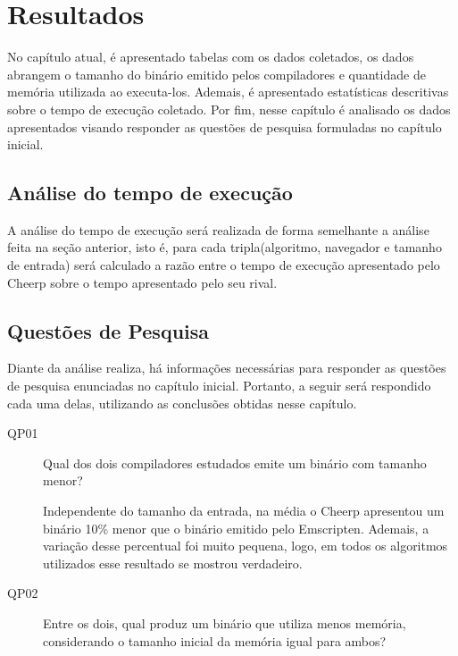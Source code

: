 
\chapter{Resultados}\label{resultados}

No capítulo atual, é apresentado tabelas com os dados coletados, os dados abrangem o tamanho do binário emitido pelos compiladores e quantidade de memória utilizada ao executa-los. Ademais, é apresentado estatísticas descritivas sobre o tempo de execução coletado. Por fim, nesse capítulo é analisado os dados apresentados visando responder as questões de pesquisa formuladas no capítulo inicial.

\section{Análise do tempo de execução}

A análise do tempo de execução será realizada de forma semelhante a análise feita na seção anterior, isto é, para cada tripla(algoritmo, navegador e tamanho de entrada) será calculado a razão entre o tempo de execução apresentado pelo Cheerp sobre o tempo apresentado pelo seu rival.



\section{Questões de Pesquisa}

Diante da análise realiza, há informações necessárias para responder as questões de pesquisa enunciadas no capítulo inicial. Portanto, a seguir será respondido cada uma delas, utilizando as conclusões obtidas nesse capítulo.

\begin{description}
    \item[QP01] Qual dos dois compiladores estudados emite um binário com tamanho menor?

    Independente do tamanho da entrada, na média o Cheerp apresentou um binário 10\% menor que o binário emitido pelo Emscripten. Ademais, a variação desse percentual foi muito pequena, logo, em todos os algoritmos utilizados esse resultado se mostrou verdadeiro.

    \item[QP02] Entre os dois, qual produz um binário que utiliza menos memória, considerando o tamanho inicial da memória igual para ambos?
\end{description}

